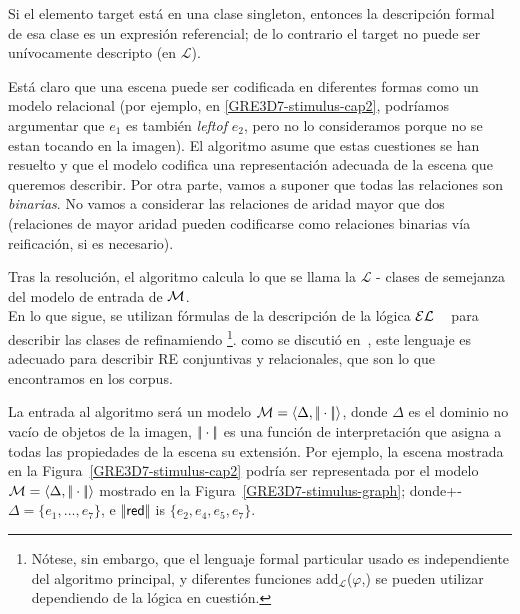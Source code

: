 Si el elemento target est\'a en
una clase singleton, entonces la descripci\'on formal de esa clase es un
expresi\'on referencial; de lo contrario el target no puede ser un\'{i}vocamente
descripto (en $\mathcal{L}$).

Est\'a claro que una escena puede ser codificada en diferentes formas como un
modelo relacional (por ejemplo, en \ref{GRE3D7-stimulus-cap2}, podr\'{i}amos argumentar que
$e_1$ es tambi\'en \emph{leftof} $e_2$, pero no lo consideramos porque no se estan 
tocando en la imagen). El algoritmo asume que estas cuestiones se han resuelto y que el modelo codifica una representaci\'on adecuada de la escena que
queremos describir. Por otra parte, vamos a suponer que todas las relaciones son
\emph{binarias}. No vamos a considerar las relaciones de aridad mayor que
dos (relaciones de mayor aridad pueden codificarse como relaciones binarias v\'{i}a
reificaci\'on, si es necesario).



Tras la resoluci\'on, el algoritmo calcula lo que se llama la
$\mathcal{L}$ - clases de semejanza del modelo de entrada de $\mathcal{M}$.\\


En lo que sigue, se utilizan f\'ormulas de la descripci\'on de la l\'ogica $\mathcal{EL}$
~\cite{baad:desc03} para describir las clases de refinamiendo
\footnote{N\'otese, sin embargo, que el lenguaje formal particular usado es
   independiente del algoritmo principal, y diferentes funciones
  add$_{\mathcal{L}}$($\varphi$,\RE) se pueden utilizar dependiendo
   de la l\'ogica en cuesti\'on.}. como se discuti\'o 
en~\cite{arec2:2008:Areces}, 
este lenguaje es adecuado para describir
RE conjuntivas y relacionales, que son lo que encontramos en los corpus.

  La entrada al algoritmo ser\'a un modelo $\mathcal{M} =
 \langle \Delta, |\!|\cdot|\!| \rangle$, donde $\Delta$ es el dominio no vac\'io de objetos de la imagen,
 $|\!|\cdot|\!|$ es una funci\'on de interpretaci\'on que asigna a todas las propiedades de la escena su extensi\'on.
 Por ejemplo, la escena mostrada en la Figura~\ref{GRE3D7-stimulus-cap2} podr\'ia ser representada por el modelo
 $\mathcal{M}=\langle \Delta,|\!|\cdot|\!| \rangle$ mostrado en la 
 Figura~\ref{GRE3D7-stimulus-graph}; donde+- $\Delta =
 \{e_1,\ldots,e_7\}$, e $|\!|\textsf{red}|\!|$ is $\{e_2, e_4, e_5,
 e_7\}$.

